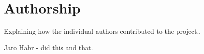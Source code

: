 \section{Authorship}

Explaining how the individual authors contributed to the project..

Jaro Habr - did this and that.